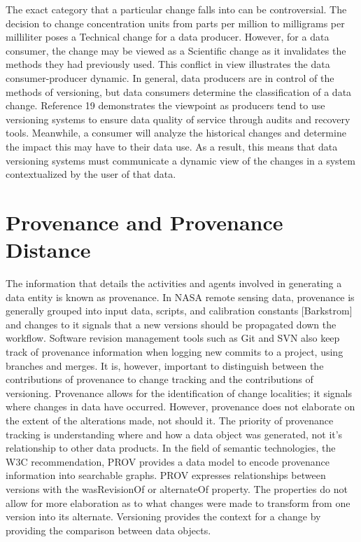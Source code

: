 The exact category that a particular change falls into can be controversial.
The decision to change concentration units from parts per million to milligrams per milliliter poses a Technical change for a data producer.
However, for a data consumer, the change may be viewed as a Scientific change as it invalidates the methods they had previously used.
This conflict in view illustrates the data consumer-producer dynamic.
In general, data producers are in control of the methods of versioning, but data consumers determine the classification of a data change.
Reference 19 demonstrates the viewpoint as producers tend to use versioning systems to ensure data quality of service through audits and recovery tools.
Meanwhile, a consumer will analyze the historical changes and determine the impact this may have to their data use.
As a result, this means that data versioning systems must communicate a dynamic view of the changes in a system contextualized by the user of that data.

\section{Provenance and Provenance Distance}

The information that details the activities and agents involved in generating a data entity is known as provenance.
In NASA remote sensing data, provenance is generally grouped into input data, scripts, and calibration constants [Barkstrom] and changes to it signals that a new versions should be propagated down the workflow.
Software revision management tools such as Git and SVN also keep track of provenance information when logging new commits to a project, using branches and merges.
It is, however, important to distinguish between the contributions of provenance to change tracking and the contributions of versioning.
Provenance allows for the identification of change localities; it signals where changes in data have occurred.
However, provenance does not elaborate on the extent of the alterations made, not should it.
The priority of provenance tracking is understanding where and how a data object was generated, not it's relationship to other data products.
In the field of semantic technologies, the W3C recommendation, PROV provides a data model to encode provenance information into searchable graphs.
PROV expresses relationships between versions with the wasRevisionOf or alternateOf property.
The properties do not allow for more elaboration as to what changes were made to transform from one version into its alternate.
Versioning provides the context for a change by providing the comparison between data objects.

